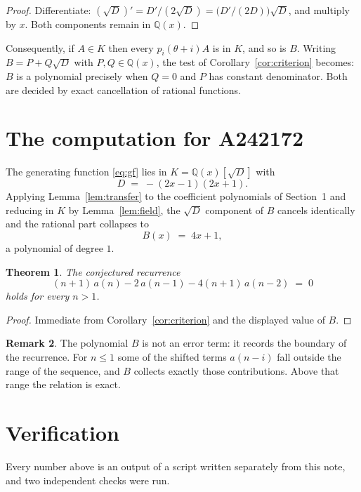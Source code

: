 \documentclass[11pt,a4paper]{article}
\theoremstyle{plain}
\newtheorem{theorem}{Theorem}
\theoremstyle{definition}
\newtheorem{remark}[theorem]{Remark}
\begin{document}
\begin{proof}
Differentiate: $(\sqrt{D})'=D'/(2\sqrt{D})=\bigl(D'/(2D)\bigr)\sqrt{D}$, and multiply by
$x$. Both components remain in $\mathbb{Q}(x)$.
\end{proof}

Consequently, if $A\in K$ then every $p_{i}(\theta+i)A$ is in $K$, and so is $B$. Writing
$B=P+Q\sqrt{D}$ with $P,Q\in\mathbb{Q}(x)$, the test of Corollary~\ref{cor:criterion}
becomes: $B$ is a polynomial precisely when $Q=0$ and $P$ has constant denominator. Both
are decided by exact cancellation of rational functions.

\section{The computation for A242172}

The generating function \eqref{eq:gf} lies in $K=\mathbb{Q}(x)[\sqrt{D}]$ with
\[
D \;=\; - \left(2 x - 1\right) \left(2 x + 1\right) .
\]
Applying Lemma~\ref{lem:transfer} to the coefficient polynomials of Section~1 and reducing
in $K$ by Lemma~\ref{lem:field}, the $\sqrt{D}$ component of $B$ cancels identically and
the rational part collapses to
\[
B(x)\;=\;4 x + 1 ,
\]
a polynomial of degree $1$.

\begin{theorem}
The conjectured recurrence
\[
(n + 1)\,a(n) - 2\,a(n-1) -  4 \left(n + 1\right)\,a(n-2) \;=\;0
\]
holds for every $n>1$.
\end{theorem}

\begin{proof}
Immediate from Corollary~\ref{cor:criterion} and the displayed value of $B$.
\end{proof}

\begin{remark}
The polynomial $B$ is not an error term: it records the boundary of the recurrence. For
$n\le1$ some of the shifted terms $a(n-i)$ fall outside the range of the sequence,
and $B$ collects exactly those contributions. Above that range the relation is exact.
\end{remark}

\section{Verification}

Every number above is an output of a script written separately from this note, and two
independent checks were run.
\end{document}
